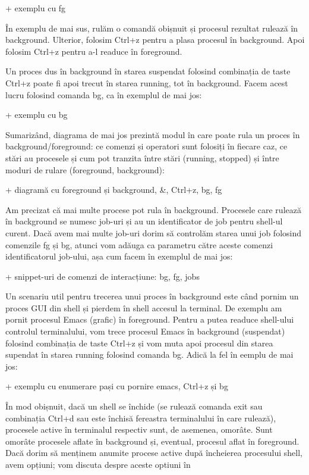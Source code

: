 + exemplu cu fg

În exemplu de mai sus, rulăm o comandă obișnuit și procesul rezultat rulează în
background. Ulterior, folosim Ctrl+z pentru a plasa procesul în background. Apoi
folosim Ctrl+z pentru a-l readuce în foreground.

Un proces dus în background în starea suspendat folosind combinația de taste
Ctrl+z poate fi apoi trecut în starea running, tot în background. Facem acest
lucru folosind comanda bg, ca în exemplul de mai jos:

+ exemplu cu bg

Sumarizând, diagrama de mai jos prezintă modul în care poate rula un proces în
background/foreground: ce comenzi și operatori sunt folosiți în fiecare caz, ce
stări au procesele și cum pot tranzita între stări (running, stopped) și între
moduri de rulare (foreground, background):

+ diagramă cu foreground și background, \&, Ctrl+z, bg, fg

Am precizat că mai multe procese pot rula în background. Procesele care rulează
în background se numesc job-uri și au un identificator de job pentru shell-ul
curent. Dacă avem mai multe job-uri dorim să controlăm starea unui job folosind
comenzile fg și bg, atunci vom adăuga ca parametru către aceste comenzi
identificatorul job-ului, așa cum facem în exemplul de mai jos:

+ snippet-uri de comenzi de interacțiune: bg, fg, jobs

Un scenariu util pentru trecerea unui proces în background este când pornim un
proces GUI din shell și pierdem în shell accesul la terminal. De exemplu am
pornit procesul Emacs (grafic) în foreground. Pentru a putea readuce shell-ului
controlul terminalului, vom trece procesul Emacs în background (suspendat)
folosind combinația de taste Ctrl+z și vom muta apoi procesul din starea
supendat în starea running folosind comanda bg. Adică la fel în eemplu de mai
jos:

+ exemplu cu enumerare pași cu pornire emacs, Ctrl+z și bg

În mod obișnuit, dacă un shell se închide (se rulează comanda exit sau
combinația Ctrl+d sau este închisă fereastra terminalului în care rulează),
procesele active în terminalul respectiv sunt, de asemenea, omorâte. Sunt
omorâte procesele aflate în background și, eventual, procesul aflat în
foreground. Dacă dorim să menținem anumite procese active după încheierea
procesului shell, avem opțiuni; vom discuta despre aceste optiuni în

